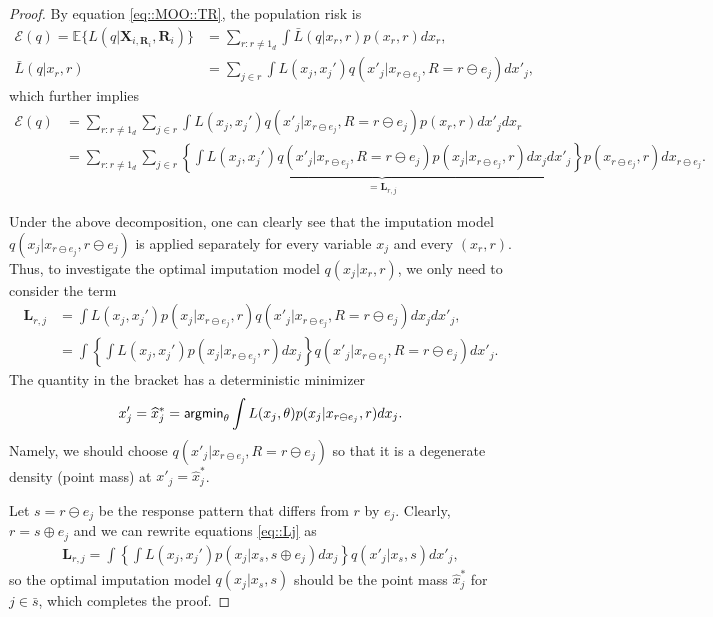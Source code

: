 \documentclass[aos, preprint]{imsart}
\theoremstyle{plain}
\theoremstyle{definition}
\let\hat\widehat
\newcommand{\E}{\mbox{$\mathbb{E}$}}
\newcommand{\bX}{\mathbf{X}}
\newcommand{\bR}{\mathbf{R}}
\begin{document}
\begin{appendix}
\begin{proof}
By equation \eqref{eq::MOO::TR},
the population risk  is
\begin{align*}
\mathcal{E}(q) = \E\{L(q| \bX_{i,\bR_i},\bR_i)\} &= \sum_{r:r\neq 1_d}\int \bar L(q|x_{r} , r) p(x_r,r)dx_r,\\
\bar L(q|x_{r} , r) & = \sum_{j \in  r}\int L(x_j, x_j')  q(x'_j|x_{r\ominus e_j},R=r\ominus e_j)dx'_j,
\end{align*}
which further implies 
\begin{align*}
\mathcal{E}(q) & = \sum_{r:r\neq 1_d} \sum_{j \in  r} \int L(x_j, x_j')  q(x'_j|x_{r\ominus e_j},R=r\ominus e_j) p(x_r,r)dx'_j dx_r\\
&= \sum_{r:r\neq 1_d} \sum_{j \in  r} \underbrace{\left\{\int L(x_j, x_j')  q(x'_j|x_{r\ominus e_j},R=r\ominus e_j) p(x_j|x_{r\ominus e_j},r)dx_jdx'_j \right\}}_{ = \mathbf{L}_{r,j}} p(x_{r\ominus e_j}, r)dx_{r\ominus e_j}.
\end{align*}

Under the above decomposition, one can clearly see that
the imputation model $q(x_j|x_{r\ominus e_j},{r\ominus e_j})$ is applied separately for every variable $x_j$
and  every $(x_r,r)$. 
Thus, to investigate the optimal imputation model $q(x_j|x_r,r)$, we only need to consider the term 
\begin{equation}
\begin{aligned}
\mathbf{L}_{r,j}
 &=\int  L(x_j, x_j') p(x_j|x_{r\ominus e_j}, r) q(x'_j|x_{r\ominus e_j},R=r\ominus e_j)dx_jdx'_j,\\
&= \int \left\{\int L(x_j, x_j') p(x_j|x_{r\ominus e_j}, r) dx_j \right\}q(x'_j|x_{r\ominus e_j},R=r\ominus e_j)dx'_j.
\end{aligned}
\label{eq::Lj}
\end{equation}
The quantity in the bracket
has a deterministic minimizer 
$$
x'_j = \hat x^*_j = {\sf argmin}_{\theta} \int L( x_j,\theta ) p(x_j|x_{r\ominus e_j}, r)dx_j.
$$
Namely, we should choose $q(x'_j|x_{r\ominus e_j},R=r\ominus e_j)$ so that  
it is a degenerate density (point mass) at $x'_j = \hat x^*_j$.


Let $s = r\ominus e_j$ be the response pattern that differs from $r$ by $e_j$.
Clearly, $r = s\oplus e_j$
and we can rewrite equations \eqref{eq::Lj} 
as 
\begin{align*}
\mathbf{L}_{r,j} = \int \left\{\int L(x_j, x_j') p(x_j|x_s, s\oplus e_j) dx_j \right\}q(x'_j|x_{s},s)dx'_j,
\end{align*}
so the optimal imputation model $q(x_j|x_{s},s)$
should be the point mass $\hat x^*_j$ for $j \in \bar s$,
which completes the proof.



\end{proof}
\end{appendix}
\end{document}
